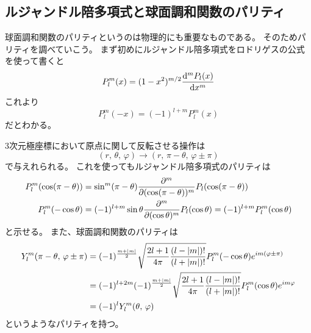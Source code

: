 \documentclass[../../master.tex]{subfiles}
\begin{document}
\subsection{ルジャンドル陪多項式と球面調和関数のパリティ}
球面調和関数のパリティというのは物理的にも重要なものである。
そのためパリティを調べていこう。
まず初めにルジャンドル陪多項式をロドリゲスの公式を使って書くと
\begin{equation}
	P_l^{m}(x) = (1-x^2)^{m/2}\dv[m]{P_l(x)}{x}
\end{equation}
これより
\begin{equation}
	P_l^m(-x) = (-1)^{l+m}P_l^m(x)
\end{equation}
だとわかる。

3次元極座標において原点に関して反転させる操作は
\begin{equation}
	(r,\,\theta,\,\varphi)\rightarrow (r,\,\pi-\theta,\,\varphi\pm\pi)
\end{equation}
で与えれられる。
これを使ってもルジャンドル陪多項式のパリティは
\begin{align}
	P_l^m(\cos(\pi-\theta)) &= \sin^m(\pi-\theta)\pdv[m]{(\cos(\pi-\theta))}P_l(\cos(\pi-\theta))\\
	P_l^m(-\cos\theta) &= (-1)^{l+m} \sin\theta\pdv[m]{(\cos\theta)}P_l(\cos\theta) =(-1)^{l+m} P_l^m(\cos\theta)
\end{align}
と示せる。
また、球面調和関数のパリティは
\begin{align}
	Y_l^m(\pi-\theta,\,\varphi\pm\pi)
	&=(-1)^{\frac{m+\abs{m}}{2}}\sqrt{\frac{2l+1}{4\pi}\frac{(l-\abs{m})!}{(l+\abs{m})!}}P_l^m(-\cos\theta)e^{im(\varphi\pm\pi)}\\
	&=(-1)^{l+2m}(-1)^{\frac{m+\abs{m}}{2}}\sqrt{\frac{2l+1}{4\pi}\frac{(l-\abs{m})!}{(l+\abs{m})!}}P_l^m(\cos\theta)e^{im\varphi}\\
	&=(-1)^lY_l^m(\theta,\,\varphi)
\end{align}
というようなパリティを持つ。
\end{document}
